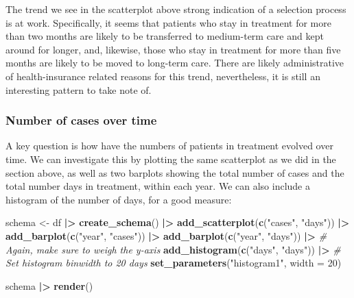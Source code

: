 \documentclass[
  openany]{book}
\newenvironment{Shaded}{\begin{snugshade}}{\end{snugshade}}
\newcommand{\AttributeTok}[1]{\textcolor[rgb]{0.13,0.29,0.53}{#1}}
\newcommand{\CommentTok}[1]{\textcolor[rgb]{0.56,0.35,0.01}{\textit{#1}}}
\newcommand{\DecValTok}[1]{\textcolor[rgb]{0.00,0.00,0.81}{#1}}
\newcommand{\FunctionTok}[1]{\textcolor[rgb]{0.13,0.29,0.53}{\textbf{#1}}}
\newcommand{\NormalTok}[1]{#1}
\newcommand{\OtherTok}[1]{\textcolor[rgb]{0.56,0.35,0.01}{#1}}
\newcommand{\SpecialCharTok}[1]{\textcolor[rgb]{0.81,0.36,0.00}{\textbf{#1}}}
\newcommand{\StringTok}[1]{\textcolor[rgb]{0.31,0.60,0.02}{#1}}
\theoremstyle{definition}
\theoremstyle{definition}
\theoremstyle{definition}
\theoremstyle{definition}
\theoremstyle{remark}
\begin{document}
The trend we see in the scatterplot above strong indication of a selection process is at work. Specifically, it seems that patients who stay in treatment for more than two months are likely to be transferred to medium-term care and kept around for longer, and, likewise, those who stay in treatment for more than five months are likely to be moved to long-term care. There are likely administrative of health-insurance related reasons for this trend, nevertheless, it is still an interesting pattern to take note of.

\subsubsection{Number of cases over time}\label{number-of-cases-over-time}

A key question is how have the numbers of patients in treatment evolved over time. We can investigate this by plotting the same scatterplot as we did in the section above, as well as two barplots showing the total number of cases and the total number days in treatment, within each year. We can also include a histogram of the number of days, for a good measure:

\begin{Shaded}
\begin{Highlighting}[]
\NormalTok{schema }\OtherTok{\textless{}{-}}\NormalTok{ df }\SpecialCharTok{|\textgreater{}}
  \FunctionTok{create\_schema}\NormalTok{() }\SpecialCharTok{|\textgreater{}}
  \FunctionTok{add\_scatterplot}\NormalTok{(}\FunctionTok{c}\NormalTok{(}\StringTok{"cases"}\NormalTok{, }\StringTok{"days"}\NormalTok{)) }\SpecialCharTok{|\textgreater{}}
  \FunctionTok{add\_barplot}\NormalTok{(}\FunctionTok{c}\NormalTok{(}\StringTok{"year"}\NormalTok{, }\StringTok{"cases"}\NormalTok{)) }\SpecialCharTok{|\textgreater{}}
  \FunctionTok{add\_barplot}\NormalTok{(}\FunctionTok{c}\NormalTok{(}\StringTok{"year"}\NormalTok{, }\StringTok{"days"}\NormalTok{)) }\SpecialCharTok{|\textgreater{}}
  \CommentTok{\# Again, make sure to weigh the y{-}axis}
  \FunctionTok{add\_histogram}\NormalTok{(}\FunctionTok{c}\NormalTok{(}\StringTok{"days"}\NormalTok{, }\StringTok{"days"}\NormalTok{)) }\SpecialCharTok{|\textgreater{}} 
   \CommentTok{\# Set histogram binwidth to 20 days}
  \FunctionTok{set\_parameters}\NormalTok{(}\StringTok{"histogram1"}\NormalTok{, }\AttributeTok{width =} \DecValTok{20}\NormalTok{)}

\NormalTok{schema }\SpecialCharTok{|\textgreater{}} \FunctionTok{render}\NormalTok{()}
\end{Highlighting}
\end{Shaded}
\end{document}
